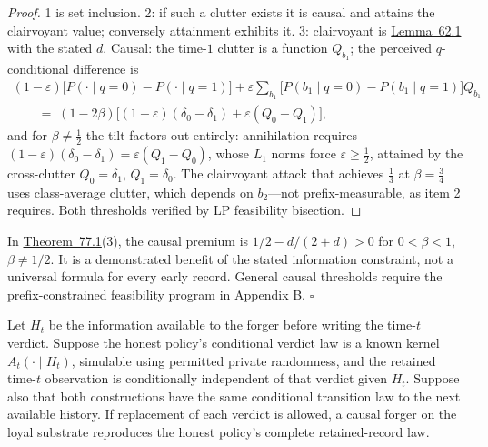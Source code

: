 \begin{proof}

1 is set inclusion. 2: if such a clutter exists it is causal and attains the clairvoyant value; conversely attainment exhibits it. 3: clairvoyant is \hyperlink{stmt:62.1}{Lemma~62.1} with the stated \(d\). Causal: the time-\(1\) clutter is a function \(Q_{b_1}\); the perceived \(q\)-conditional difference is
\[\begin{gathered}(1-\varepsilon)\big[P(\cdot \mid q{=}0) - P(\cdot \mid q{=}1)\big] + \varepsilon \sum_{b_1}\big[P(b_1 \mid q{=}0) - P(b_1 \mid q{=}1)\big] Q_{b_1} \\ {}\qquad =\; (1-2\beta)\Big[(1-\varepsilon)(\delta_0 - \delta_1) + \varepsilon (Q_0 - Q_1)\Big],\end{gathered}\]
and for \(\beta \ne \tfrac12\) the tilt factors out entirely: annihilation requires \((1-\varepsilon)(\delta_0 - \delta_1) = \varepsilon(Q_1 - Q_0)\), whose \(L_1\) norms force \(\varepsilon \ge \tfrac12\), attained by the cross-clutter \(Q_0 = \delta_1\), \(Q_1 = \delta_0\). The clairvoyant attack that achieves \(\tfrac13\) at \(\beta = \tfrac34\) uses class-average clutter, which depends on \(b_2\)---\hspace{0pt}not prefix-measurable, as item 2 requires. Both thresholds verified by LP feasibility bisection.
\end{proof}

\begin{thmplain}

In \hyperlink{stmt:77.1}{Theorem~77.1}(3), the causal premium is \(1/2-d/(2+d)>0\) for \(0<\beta<1\), \(\beta\ne1/2\). It is a demonstrated benefit of the stated information constraint, not a universal formula for every early record. General causal thresholds require the prefix-constrained feasibility program in Appendix B. \(\square\)
\end{thmplain}


\begin{thmplain}

Let \(H_t\) be the information available to the forger before writing the time-\(t\) verdict. Suppose the honest policy's conditional verdict law is a known kernel \(A_t(\cdot\mid H_t)\), simulable using permitted private randomness, and the retained time-\(t\) observation is conditionally independent of that verdict given \(H_t\). Suppose also that both constructions have the same conditional transition law to the next available history. If replacement of each verdict is allowed, a causal forger on the loyal substrate reproduces the honest policy's complete retained-record law.
\end{thmplain}

